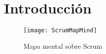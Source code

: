 \chapter{Introducción}


\begin{figure}[h]
  \centering
  \texttt{[image: ScrumMapMind]}
  \caption{Mapa mental sobre Scrum}
  \centering
  \label{fig:ScrumMapMind} %
\end{figure}
